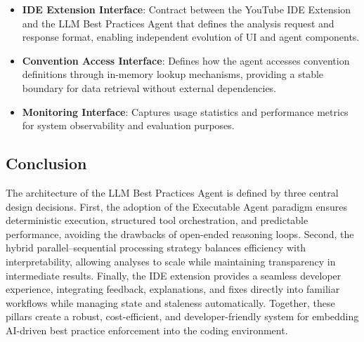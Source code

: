 \begin{spacing}{1.2}
\begin{itemize}
    \item \textbf{IDE Extension Interface}: Contract between the YouTube IDE Extension and the LLM Best Practices Agent that defines the analysis request and response format, enabling independent evolution of UI and agent components.
    \item \textbf{Convention Access Interface}: Defines how the agent accesses convention definitions through in-memory lookup mechanisms, providing a stable boundary for data retrieval without external dependencies.
    \item \textbf{Monitoring Interface}: Captures usage statistics and performance metrics for system observability and evaluation purposes.
\end{itemize}


\subsection*{Conclusion}
The architecture of the LLM Best Practices Agent is defined by three central design decisions. First, the adoption of the Executable Agent paradigm ensures deterministic execution, structured tool orchestration, and predictable performance, avoiding the drawbacks of open-ended reasoning loops. Second, the hybrid parallel–sequential processing strategy balances efficiency with interpretability, allowing analyses to scale while maintaining transparency in intermediate results. Finally, the IDE extension provides a seamless developer experience, integrating feedback, explanations, and fixes directly into familiar workflows while managing state and staleness automatically. Together, these pillars create a robust, cost-efficient, and developer-friendly system for embedding AI-driven best practice enforcement into the coding environment.
\end{spacing}
